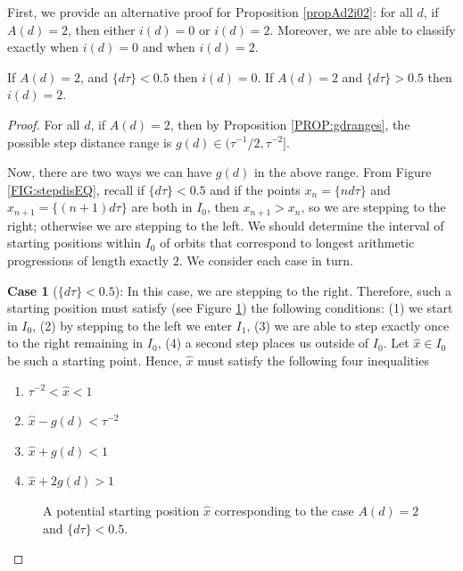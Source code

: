 \documentclass[10pt,a4paper,reqno]{amsart}
\begin{document}
First, we provide an alternative proof for Proposition \ref{propAd2i02}: for all $d$, if $A(d)=2$, then either $i(d)=0$ or $i(d)=2$. Moreover, we are able to classify exactly when $i(d)=0$ and when $i(d)=2$.
\begin{prop}\label{PROP:ad2i02details}
If $A(d)=2$, and $\{ d\tau\}<0.5$ then $i(d)=0$. If $A(d)=2$ and $\{ d\tau\}>0.5$ then $i(d)=2$.
\end{prop}
\begin{proof}
For all $d$, if $A(d)=2$, then by Proposition \ref{PROP:gdranges}, the possible step distance range is $g(d)\in(\tau^{-1}/2,\tau^{-2}]$.

Now, there are two ways we can have $g(d)$ in the above range. From Figure \ref{FIG:stepdisEQ}, recall if $\{ d\tau\} < 0.5$ and if the points $x_n = \{ nd\tau\}$ and $x_{n+1} = \{ (n+1)d\tau\}$ are both in $I_0$, then $x_{n+1}>x_n$, so we are stepping to the right; otherwise we are stepping to the left.
We should determine the interval of starting positions within $I_0$ of orbits that correspond to longest arithmetic progressions of length exactly $2$. We consider each case in turn.

\textbf{Case 1} ($\{ d\tau\} < 0.5$): In this case, we are stepping to the right. Therefore, such a starting position must satisfy (see Figure \ref{FIG:whenad2i0}) the following conditions: (1) we start in $I_0$, (2) by stepping to the left we enter $I_1$, (3) we are able to step exactly once to the right remaining in $I_0$, (4) a second step places us outside of $I_0$. Let $\hat{x}\in I_0$ be such a starting point. Hence, $\hat{x}$ must satisfy the following four inequalities
\begin{enumerate}
\item[(i)] $\tau^{-2}<\hat{x}<1$
\item[(ii)] $\hat{x}-g(d)<\tau^{-2}$
\item[(iii)] $\hat{x}+g(d)<1$
\item[(iv)] $\hat{x}+2g(d)>1$
\end{enumerate}

\begin{figure}[ht]
\centering
{}
\caption{A potential starting position $\hat{x}$ corresponding to the case $A(d) = 2$ and $\{ d\tau \}<0.5$.}
\label{FIG:whenad2i0}
\end{figure}


\end{proof}
\end{document}
